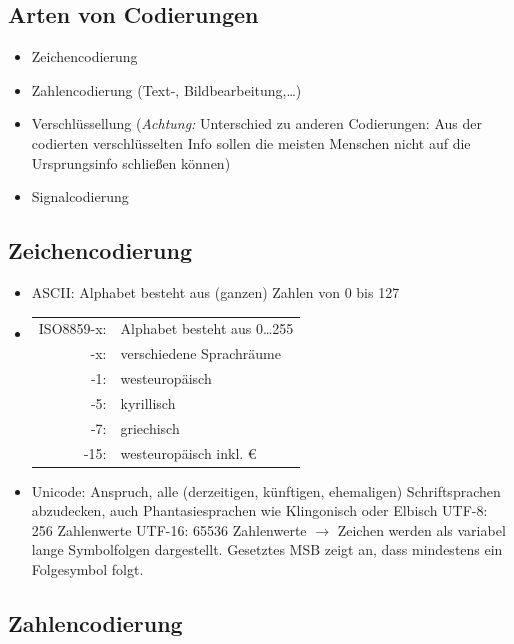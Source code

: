 \documentclass[10pt,a4paper]{scrartcl}
\begin{document}
	\subsection{Arten von Codierungen}
	\begin{itemize}
		\item Zeichencodierung
		\item Zahlencodierung (Text-, Bildbearbeitung,\dots)
		\item Verschlüssellung (\textit{Achtung:} Unterschied zu anderen Codierungen: Aus der codierten verschlüsselten Info sollen die meisten Menschen nicht auf die Ursprungsinfo schließen können)
		\item Signalcodierung
	\end{itemize}

	\subsection{Zeichencodierung}
	\begin{itemize}
		\item ASCII: Alphabet besteht aus (ganzen) Zahlen von 0 bis 127
		\item \begin{tabular}[t]{rl}
			ISO8859-x: & Alphabet besteht aus 0\dots255\\
			-x: & verschiedene Sprachräume\\
			-1: & westeuropäisch\\
			-5: & kyrillisch\\
			-7: & griechisch\\
		  -15: & westeuropäisch inkl. \euro{}
		\end{tabular}
		\item Unicode: Anspruch, alle (derzeitigen, künftigen, ehemaligen) Schriftsprachen abzudecken, auch Phantasiesprachen wie Klingonisch oder Elbisch
		\subitem UTF-8: 256 Zahlenwerte
		\subitem UTF-16: 65536 Zahlenwerte
		\subitem$ \rightarrow $ Zeichen werden als variabel lange Symbolfolgen dargestellt. Gesetztes MSB zeigt an, dass mindestens ein Folgesymbol folgt.
	\end{itemize}
	\subsection{Zahlencodierung}
\end{document}
